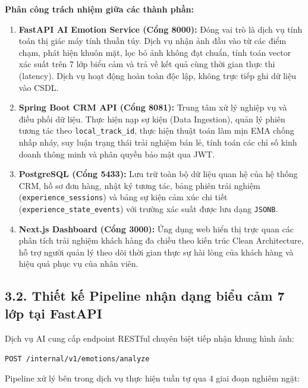 \noindent \textbf{Phân công trách nhiệm giữa các thành phần:}
\begin{enumerate}
    \item \textbf{FastAPI AI Emotion Service (Cổng 8000):} Đóng vai trò là dịch vụ tính toán thị giác máy tính thuần túy. Dịch vụ nhận ảnh đầu vào từ các điểm chạm, phát hiện khuôn mặt, lọc bỏ ảnh không đạt chuẩn, tính toán vector xác suất trên 7 lớp biểu cảm và trả về kết quả cùng thời gian thực thi (latency). Dịch vụ hoạt động hoàn toàn độc lập, không trực tiếp ghi dữ liệu vào CSDL.
    \item \textbf{Spring Boot CRM API (Cổng 8081):} Trung tâm xử lý nghiệp vụ và điều phối dữ liệu. Thực hiện nạp sự kiện (Data Ingestion), quản lý phiên tương tác theo \texttt{local\_track\_id}, thực hiện thuật toán làm mịn EMA chống nhấp nháy, suy luận trạng thái trải nghiệm bán lẻ, tính toán các chỉ số kinh doanh thông minh và phân quyền bảo mật qua JWT.
    \item \textbf{PostgreSQL (Cổng 5433):} Lưu trữ toàn bộ dữ liệu quan hệ của hệ thống CRM, hồ sơ đơn hàng, nhật ký tương tác, bảng phiên trải nghiệm (\texttt{experience\_sessions}) và bảng sự kiện cảm xúc chi tiết (\texttt{experience\_state\_events}) với trường xác suất được lưu dạng \texttt{JSONB}.
    \item \textbf{Next.js Dashboard (Cổng 3000):} Ứng dụng web hiển thị trực quan các phân tích trải nghiệm khách hàng đa chiều theo kiến trúc Clean Architecture, hỗ trợ người quản lý theo dõi thời gian thực sự hài lòng của khách hàng và hiệu quả phục vụ của nhân viên.
\end{enumerate}

\subsection*{3.2. Thiết kế Pipeline nhận dạng biểu cảm 7 lớp tại FastAPI}

Dịch vụ AI cung cấp endpoint RESTful chuyên biệt tiếp nhận khung hình ảnh:
\begin{center}
\texttt{POST /internal/v1/emotions/analyze}
\end{center}
Pipeline xử lý bên trong dịch vụ thực hiện tuần tự qua 4 giai đoạn nghiêm ngặt:

